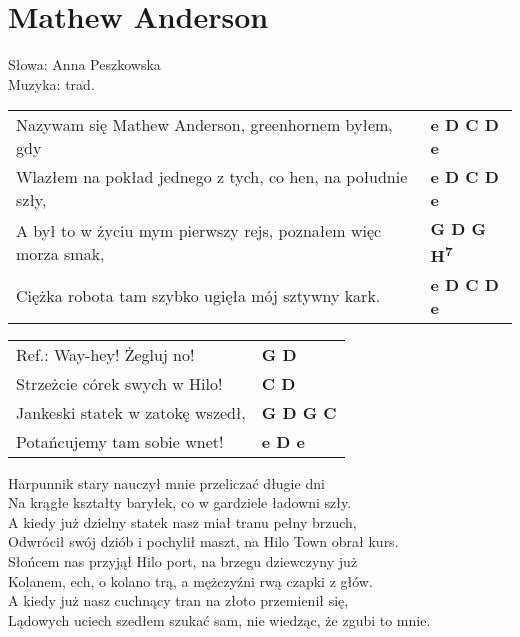 \section{Mathew Anderson}

Słowa: Anna Peszkowska \\
Muzyka:  trad.

\vspace{2em}
\begin{tabular}{@{}p{10.5cm}@{}l@{}}
Nazywam się Mathew Anderson, greenhornem byłem, gdy & \bfseries  e D C D e \\
Wlazłem na pokład jednego z tych, co hen, na południe szły, & \bfseries  e D C D e \\
A był to w życiu mym pierwszy rejs, poznałem więc morza smak, & \bfseries  G D G H\textsuperscript{7} \\
Ciężka robota tam szybko ugięła mój sztywny kark. & \bfseries  e D C D e \\
\end{tabular}

\vspace{1em}
\begin{tabular}{@{}p{10.5cm}@{}l@{}}
Ref.: Way-hey! Żegluj no! & \bfseries  G D \\
Strzeżcie córek swych w Hilo! & \bfseries  C D \\
Jankeski statek w zatokę wszedł, & \bfseries  G D G C \\
Potańcujemy tam sobie wnet! & \bfseries  e D e \\
\end{tabular}

\vspace{1em}
Harpunnik stary nauczył mnie przeliczać długie dni \\
Na krągłe kształty baryłek, co w gardziele ładowni szły. \\
A kiedy już dzielny statek nasz miał tranu pełny brzuch, \\
Odwrócił swój dziób i pochylił maszt, na Hilo Town obrał kurs. \\

Słońcem nas przyjął Hilo port, na brzegu dziewczyny już \\
Kolanem, ech, o kolano trą, a mężczyźni rwą czapki z głów. \\
A kiedy już nasz cuchnący tran na złoto przemienił się, \\
Lądowych uciech szedłem szukać sam, nie wiedząc, że zgubi to mnie. \\

